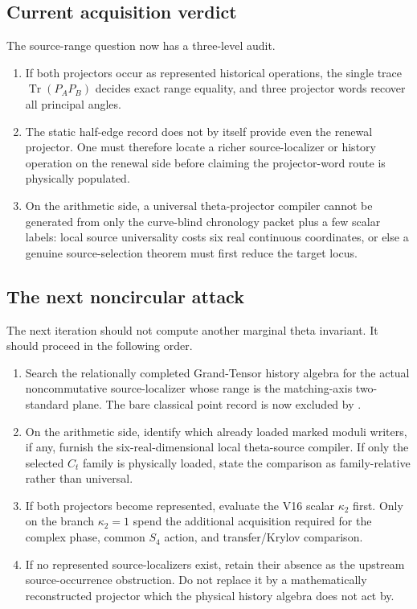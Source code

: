 \documentclass[11pt]{article}
\theoremstyle{definition}
\theoremstyle{remark}
\newcommand{\Tr}{\operatorname{Tr}}
\begin{document}
\subsection{Current acquisition verdict}
The source-range question now has a three-level audit.
\begin{enumerate}[label=\textup{(A\arabic*)},leftmargin=3em]
\item If both projectors occur as represented historical operations, the
      single trace $\Tr(P_AP_B)$ decides exact range equality, and three
      projector words recover all principal angles.
\item The static half-edge record does not by itself provide even the renewal
      projector.  One must therefore locate a richer source-localizer or
      history operation on the renewal side before claiming the projector-word
      route is physically populated.
\item On the arithmetic side, a universal theta-projector compiler cannot be
      generated from only the curve-blind chronology packet plus a few scalar
      labels: local source universality costs six real continuous coordinates,
      or else a genuine source-selection theorem must first reduce the target
      locus.
\end{enumerate}

\subsection{The next noncircular attack}
The next iteration should not compute another marginal theta invariant.  It
should proceed in the following order.
\begin{enumerate}[label=\textup{(N\arabic*)},leftmargin=3em]
\item Search the relationally completed Grand-Tensor history algebra for the
      actual noncommutative source-localizer whose range is the matching-axis
      two-standard plane.  The bare classical point record is now excluded by
      .
\item On the arithmetic side, identify which already loaded marked moduli
      writers, if any, furnish the six-real-dimensional local theta-source
      compiler.  If only the selected $C_t$ family is physically loaded, state
      the comparison as family-relative rather than universal.
\item If both projectors become represented, evaluate the V16 scalar
      $\kappa_2$ first.  Only on the branch $\kappa_2=1$ spend the additional
      acquisition required for the complex phase, common $S_4$ action, and
      transfer/Krylov comparison.
\item If no represented source-localizers exist, retain their absence as the
      upstream source-occurrence obstruction.  Do not replace it by a
      mathematically reconstructed projector which the physical history algebra
      does not act by.
\end{enumerate}
\end{document}
